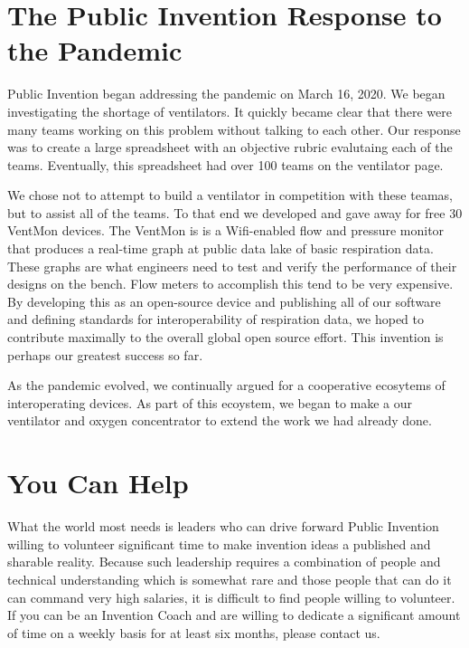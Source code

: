 \documentclass[
	fontsize=10pt, %
	twoside=false, %
	secnumdepth=1, %
]{kaobook}
\begin{document}
\chapter{The Public Invention Response to the Pandemic}

Public Invention began addressing the pandemic on March 16, 2020.
We began investigating the shortage of ventilators.
It quickly became clear that there were many teams working on this
problem without talking to each other.
Our response was to create a large spreadsheet with an objective
rubric evalutaing each of the teams.
Eventually, this spreadsheet had over 100 teams on the ventilator
page.

We chose not to attempt to build a ventilator in competition with
these teamas, but to assist all of the teams.
To that end we developed and gave away for free 30 VentMon devices.
The VentMon is is a Wifi-enabled flow and pressure monitor that
produces a real-time graph at public data lake of basic respiration
data.
These graphs are what engineers need to test and verify the performance
of their designs on the bench.
Flow meters to accomplish this tend to be very expensive.
By developing this as an open-source device and publishing all of our
software and defining standards for interoperability of respiration
data, we hoped to contribute maximally to the overall global
open source effort. This invention is perhaps our greatest success
so far.

As the pandemic evolved, we continually argued for a cooperative
ecosytems of interoperating devices.
As part of this ecoystem, we began to make a our ventilator
and oxygen concentrator to extend the work we had already done.

\chapter{You Can Help}

What the world most needs is leaders who can drive forward
Public Invention willing to volunteer significant time
to make invention ideas a published and sharable reality.
Because such leadership requires a combination of people and
technical understanding which is somewhat rare and those
people that can do it can command very high salaries,
it is difficult to find people willing to volunteer.
If you can be an Invention Coach and are willing to
dedicate a significant amount of time on a weekly basis
for at least six months, please contact us.
\end{document}
